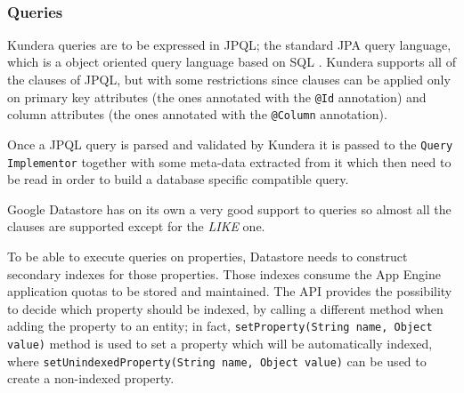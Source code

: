 \begin{table}[ht]
\small
\centering
{}
\\
\caption{Mapping of entity fields on Google Datastore}
\label{table:gae-mapping}
\end{table}

\subsubsection{Queries}
Kundera queries are to be expressed in JPQL; the standard JPA query language, which is a  object oriented query language based on SQL \cite{book:projpa2}.
Kundera supports all of the clauses of JPQL, but with some restrictions since clauses can be applied only on primary key attributes (the ones annotated with the \texttt{@Id} annotation) and column attributes (the ones annotated with the \texttt{@Column} annotation).

\noindent Once a JPQL query is parsed and validated by Kundera it is passed to the \texttt{Query Implementor} together with some meta-data extracted from it which then need to be read in order to build a database specific compatible query.
    
\newparagraph Google Datastore has on its own a very good support to queries so almost all the clauses are supported except for the \textit{LIKE} one.

\noindent To be able to execute queries on properties, Datastore needs to construct secondary indexes for those properties. Those indexes consume the App Engine application quotas to be stored and maintained. The API provides the possibility to decide which property should be indexed, by calling a different method when adding the property to an entity; in fact, \texttt{setProperty(String name, Object value)} method is used to set a property which will be automatically indexed, where \texttt{setUnindexedProperty(String name, Object value)} can be used to create a non-indexed property.

